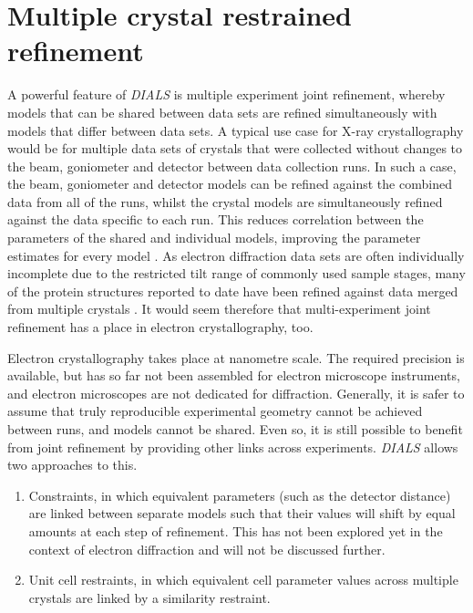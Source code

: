 \documentclass[preprint]{iucr}
\newcommand{\dials}{\emph{DIALS}\xspace}
\begin{document}
\section{Multiple crystal restrained refinement \label{sec:group_cell_restraints}}

A powerful feature of \dials is multiple experiment joint refinement, whereby
models that can be shared between data sets are refined simultaneously with
models that differ between data sets. A typical use case for X-ray
crystallography would be for multiple data sets of crystals that were collected
without changes to the beam, goniometer and detector between data collection
runs. In such a case, the beam, goniometer and detector models can be refined
against the combined data from all of the runs, whilst the crystal models are
simultaneously refined against the data specific to each run. This reduces
correlation between the parameters of the shared and individual models,
improving the parameter estimates for every model \cite{Waterman2016}. As
electron diffraction data sets are often individually incomplete due to the
restricted tilt range of commonly used sample stages, many of the protein
structures reported to date have been refined against data merged from multiple
crystals \cite{Yonekura2015,Clabbers2017,DelaCruz2017}. It would seem therefore
that multi-experiment joint refinement has a place in electron crystallography,
too.

Electron crystallography takes place at nanometre scale. The required precision
is available, but has so far not been assembled for electron microscope
\cite{nm_gonio:2013,prigo:2015} instruments, and electron microscopes are not
dedicated for diffraction.  Generally, it is safer to assume that truly
reproducible experimental geometry cannot be achieved between runs, and models
cannot be shared. Even so, it is still possible to benefit from joint
refinement by providing other links across
experiments. \dials allows two approaches to this.

\begin{enumerate}
  \item Constraints, in which equivalent parameters (such as the detector
  distance) are linked between separate models such that their values will
  shift by equal amounts at each step of refinement. This has not been explored
  yet in the context of electron diffraction and will not be discussed further.
  \item Unit cell restraints, in which equivalent cell parameter values across
  multiple crystals are linked by a similarity restraint.
\end{enumerate}
\end{document}
